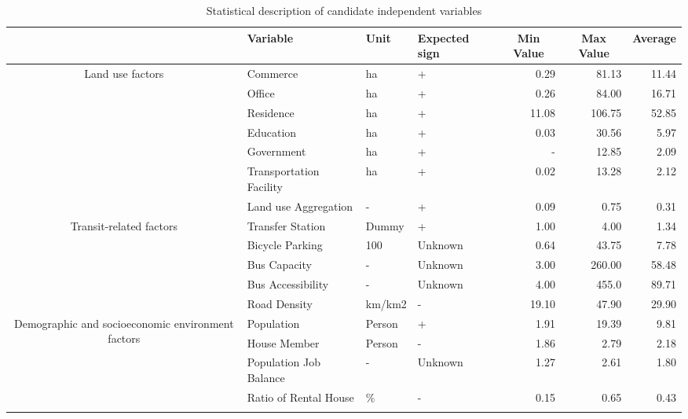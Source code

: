 \begin{sidewaystable}[htbp] %
	\centering
	\caption{Statistical description of candidate independent variables}
	\label{tab:chp3:StatisticalDescription} %
	\small
	\renewcommand{\arraystretch}{1.25} %
	
	\begin{tabular}{clllrrr}
		\Xhline{1.5pt}
		
		\multicolumn{1}{c}{Category} & %
		\multicolumn{1}{l}{Variable} &
		\multicolumn{1}{l}{Unit} &
		\multicolumn{1}{l}{Expected sign} &
		\multicolumn{1}{c}{Min Value} &	
		\multicolumn{1}{c}{Max Value} &	
		\multicolumn{1}{c}{Average}\\
		\midrule
		
		\multirow{7}{90pt}{\centering Land use factors} %
		& Commerce & ha & + & 0.29 & 81.13 & 11.44 \\
		& Office & ha & + & 0.26  & 84.00 & 16.71 \\
		& Residence & ha & + & 11.08 & 106.75 & 52.85 \\
		& Education & ha & + & 0.03 & 30.56 & 5.97 \\
		& Government & ha & + & - & 12.85 & 2.09 \\
		& Transportation Facility & ha & + & 0.02 & 13.28 & 2.12 \\
		& Land use Aggregation & - & + & 0.09 & 0.75 & 0.31 \\
		\midrule
		
		\multirow{5}{90pt}{\centering Transit-related factors}
		& Transfer Station & Dummy & + & 1.00 & 4.00 & 1.34 \\
		& Bicycle Parking & 100 & Unknown & 0.64 & 43.75 & 7.78 \\
		& Bus Capacity & - & Unknown & 3.00 & 260.00 & 58.48 \\
		& Bus Accessibility & - & Unknown & 4.00 & 455.0 & 89.71 \\
		& Road Density & km/km2 & - & 19.10 & 47.90 & 29.90 \\
		\midrule
		
		\multirow{4}{90pt}{\centering Demographic and socioeconomic environment factors} 
		& Population & Person & + & 1.91 & 19.39 & 9.81 \\
		& House Member & Person & - & 1.86 & 2.79 & 2.18 \\
		& Population Job Balance & - & Unknown & 1.27 & 2.61 & 1.80 \\
		& Ratio of Rental House & \% & - & 0.15 & 0.65 & 0.43 \\
		\Xhline{1.5pt}
	\end{tabular}
\end{sidewaystable}

